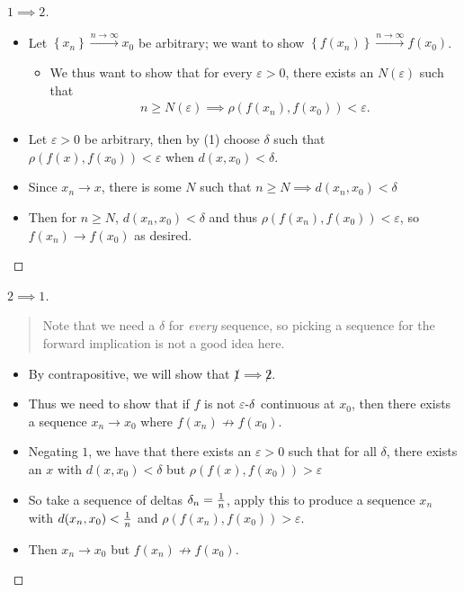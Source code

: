 \begin{solution}

\begin{proof}[$1\implies 2$]

\envlist

\begin{itemize}
\tightlist
\item
  Let \(\left\{{x_n}\right\} \overset{n\to\infty}\to x_0\) be arbitrary;
  we want to show
  \(\left\{{f(x_n)}\right\}\overset{n\to\infty}\to f(x_0)\).

  \begin{itemize}
  \tightlist
  \item
    We thus want to show that for every \(\varepsilon>0\), there exists
    an \(N(\varepsilon)\) such that
    \begin{align*}n\geq N(\varepsilon) \implies \rho(f(x_n),  f(x_0)) < \varepsilon.\end{align*}
  \end{itemize}
\item
  Let \(\varepsilon>0\) be arbitrary, then by (1) choose \(\delta\) such
  that \(\rho(f(x), f(x_0)) < \varepsilon\) when \(d(x, x_0) < \delta\).
\item
  Since \(x_n\to x\), there is some \(N\) such that
  \(n\geq N \implies d(x_n, x_0) < \delta\)
\item
  Then for \(n\geq N\), \(d(x_n, x_0) < \delta\) and thus
  \(\rho(f(x_n), f(x_0)) < \varepsilon\), so \(f(x_n)\to f(x_0)\) as
  desired.
\end{itemize}

\end{proof}

\begin{proof}[$2\implies 1$]

\begin{quote}
Note that we need a \(\delta\) for \emph{every} sequence, so picking a
sequence for the forward implication is not a good idea here.
\end{quote}

\begin{itemize}
\tightlist
\item
  By contrapositive, we will show that \(\not 1\implies \not 2\).
\item
  Thus we need to show that if \(f\) is not
  \(\varepsilon{\hbox{-}}\delta\) continuous at \(x_0\), then there
  exists a sequence \(x_n\to x_0\) where \(f(x_n)\not\to f(x_0)\).
\item
  Negating \(1\), we have that there exists an \(\varepsilon>0\) such
  that for all \(\delta\), there exists an \(x\) with
  \(d(x, x_0) < \delta\) but \(\rho(f(x), f(x_0))>\varepsilon\)
\item
  So take a sequence of deltas \(\delta_n = {1\over n}\), apply this to
  produce a sequence \(x_n\) with \(d(x_n, x_0) < {1\over n}\) and
  \(\rho(f(x_n), f(x_0)) > \varepsilon\).
\item
  Then \(x_n \to x_0\) but \(f(x_n) \not\to f(x_0)\).
\end{itemize}

\end{proof}

\end{solution}

